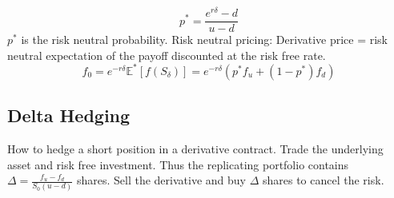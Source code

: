 \documentclass{article}
\begin{document}
$$p^* = \frac{e^{r\delta} - d}{u - d}$$
$p^*$ is the risk neutral probability. Risk neutral pricing: Derivative price = risk neutral expectation of the payoff discounted at the risk free rate. 
$$f_0 = e^{-r\delta}\mathbb{E}^*\left[f(S_{\delta})\right] = e^{-r\delta} \left(p^* f_u + (1-p^*)f_d\right)$$

\subsection*{Delta Hedging}
How to hedge a short position in a derivative contract. Trade the underlying asset and risk free investment. Thus the replicating portfolio contains $\Delta = \frac{f_u - f_d}{S_0 (u-d)}$ shares. Sell the derivative and buy $\Delta$ shares to cancel the risk. 
\end{document}
